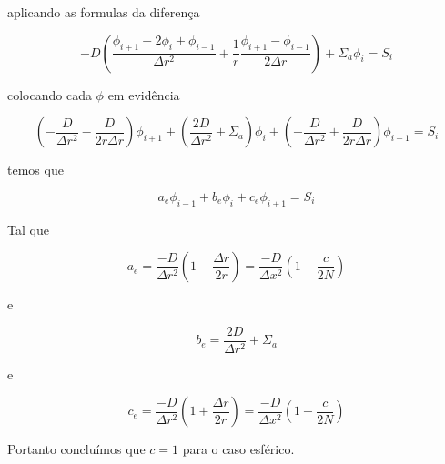 \documentclass{article}
\begin{document}
                aplicando as formulas da diferença
        
                \begin{equation}
                    -D ( \frac{\phi_{i+1} - 2\phi_i + \phi_{i-1}}{\Delta r^2}   +   \frac{1}{r}  \frac{ \phi_{i+1} - \phi_{i-1}}{ 2 \Delta r} ) + \Sigma_a \phi_i = S_i
                \end{equation}
    
                colocando cada $\phi$ em evidência
                
                \begin{equation}
                    ( -\frac{D}{\Delta r^2} - \frac{D}{2r \Delta r} ) \phi_{i+1}    +    (\frac{2D}{\Delta r^2} + \Sigma_a) \phi_i    +    (-\frac{D}{\Delta r^2} + \frac{D}{2r \Delta r} ) \phi_{i-1} = S_i
                \end{equation}
    
                temos que
                
                \begin{equation}
                    a_e \phi_{i-1}    +    b_e \phi_i    +    c_e \phi_{i+1} = S_i
                \end{equation}
        
                Tal que
        
                \begin{equation}
                    a_e = \frac{-D}{\Delta r^2} (1 - \frac{\Delta r}{2r}) = \frac{-D}{\Delta x^2} ( 1 - \frac{c}{2N}) 
                \end{equation}
                
                e
        
                \begin{equation}
                    b_e = \frac{2D}{\Delta r^2} + \Sigma_a
                \end{equation}
                
                e
        
                \begin{equation}
                    c_e = \frac{-D}{\Delta r^2} (1 + \frac{\Delta r}{2r}) = \frac{-D}{\Delta x^2} ( 1 + \frac{c}{2N}) 
                \end{equation}
    
                Portanto concluímos que $c=1$ para o caso esférico.
    
    
    
    
    
\end{document}
